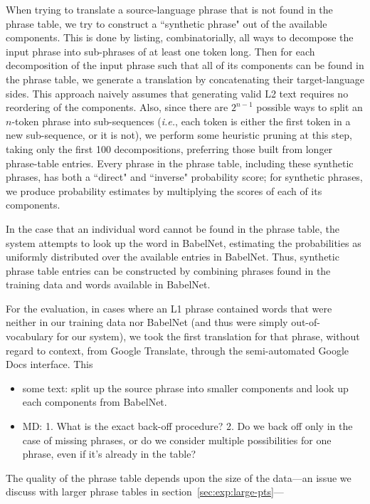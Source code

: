 \documentclass[11pt]{article}
\begin{document}
When trying to translate a source-language phrase that is not found in the
phrase table, we try to construct a ``synthetic phrase" out of the available
components. This is done by listing, combinatorially, all ways to decompose the
input phrase into sub-phrases of at least one token long. Then for each
decomposition of the input phrase such that all of its components can be found
in the phrase table, we generate a translation by concatenating their
target-language sides. This approach naively assumes that generating valid L2
text requires no reordering of the components. Also, since there are $2^{n-1}$
possible ways to split an $n$-token phrase into sub-sequences (\textit{i.e.},
each token is either the first token in a new sub-sequence, or it is not), we
perform some heuristic pruning at this step, taking only the first 100
decompositions, preferring those built from longer phrase-table entries. Every
phrase in the phrase table, including these synthetic phrases, has both a
``direct" and ``inverse" probability score; for synthetic phrases, we produce
probability estimates by multiplying the scores of each of its components.

In the case that an individual word cannot be found in the phrase table, the
system attempts to look up the word in BabelNet, estimating the probabilities
as uniformly distributed over the available entries in BabelNet. Thus,
synthetic phrase table entries can be constructed by combining phrases found in
the training data and words available in BabelNet.

For the evaluation, in cases where an L1 phrase contained words that were
neither in our training data nor BabelNet (and thus were simply
out-of-vocabulary for our system), we took the first translation for that
phrase, without regard to context, from Google Translate, through the
semi-automated Google Docs interface. This 

\begin{itemize}
\item some text: split up the source phrase into smaller components
  and look up each components from BabelNet.
\item MD: 1. What is the exact back-off procedure? 2. Do we back off
  only in the case of missing phrases, or do we consider multiple
  possibilities for one phrase, even if it’s already in the table?
\end{itemize}

The quality of the phrase table depends upon the size of the data---an issue we
discuss with larger phrase tables in section~\ref{sec:exp:large-pts}---
\end{document}
